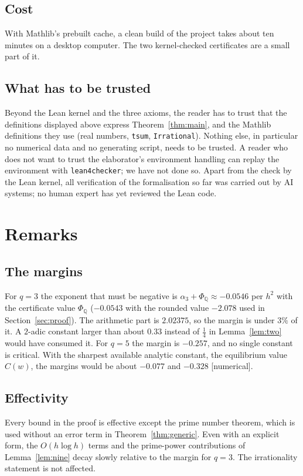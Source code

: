 \documentclass[11pt]{amsart}
\theoremstyle{definition}
\theoremstyle{remark}
\numberwithin{equation}{section}
\newcommand{\lean}[1]{{\def\_{\textunderscore\allowbreak}\texttt{#1}}}
\begin{document}
\subsection{Cost}
With Mathlib's prebuilt cache, a clean build of the project takes about ten minutes on a desktop computer. The two
kernel-checked certificates are a small part of it.

\subsection{What has to be trusted}
Beyond the Lean kernel and the three axioms, the reader has to trust that the definitions displayed above express
Theorem~\ref{thm:main}, and the Mathlib definitions they use (real numbers, \lean{tsum}, \lean{Irrational}). Nothing
else, in particular no numerical data and no generating script, needs to be trusted. A reader who does not want to
trust the elaborator's environment handling can replay the environment with \lean{lean4checker}; we have not done so. Apart from the check
by the Lean kernel, all verification of the formalisation so far was carried out by AI systems; no human expert has
yet reviewed the Lean code.

\section{Remarks}\label{sec:remarks}

\subsection{The margins}
For $q=3$ the exponent that must be negative is $\alpha_3+\Phi_{\mathbb Q}\approx-0.0546$ per $h^2$ with the certificate
value $\Phi_{\mathbb Q}$ ($-0.0543$ with the rounded value $-2.078$ used in Section~\ref{sec:proof}). The arithmetic part is
$2.02375$, so the margin is under $3\%$ of it. A $2$-adic constant larger than about $0.33$ instead of $\frac14$ in
Lemma~\ref{lem:two} would have consumed it. For $q=5$ the margin is $-0.257$, and no single constant is critical. With the
sharpest available analytic constant, the equilibrium value $C(w)$, the margins would be about $-0.077$ and $-0.328$
[numerical].

\subsection{Effectivity}
Every bound in the proof is effective except the prime number theorem, which is used without an error term in
Theorem~\ref{thm:generic}. Even with an explicit form, the $O(h\log h)$ terms and the prime-power contributions of
Lemma~\ref{lem:nine} decay slowly relative to the margin for $q=3$. The irrationality statement is not affected.
\end{document}
